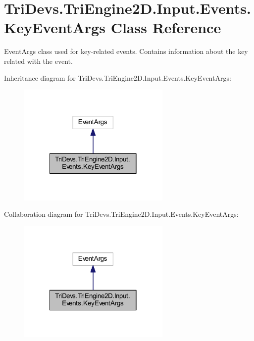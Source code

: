 \hypertarget{class_tri_devs_1_1_tri_engine2_d_1_1_input_1_1_events_1_1_key_event_args}{\section{Tri\-Devs.\-Tri\-Engine2\-D.\-Input.\-Events.\-Key\-Event\-Args Class Reference}
\label{class_tri_devs_1_1_tri_engine2_d_1_1_input_1_1_events_1_1_key_event_args}
}


Event\-Args class used for key-\/related events. Contains information about the key related with the event.  




Inheritance diagram for Tri\-Devs.\-Tri\-Engine2\-D.\-Input.\-Events.\-Key\-Event\-Args\-:
\nopagebreak
\begin{figure}[H]
\begin{center}
\leavevmode
\includegraphics[width=210pt]{class_tri_devs_1_1_tri_engine2_d_1_1_input_1_1_events_1_1_key_event_args__inherit__graph}
\end{center}
\end{figure}


Collaboration diagram for Tri\-Devs.\-Tri\-Engine2\-D.\-Input.\-Events.\-Key\-Event\-Args\-:
\nopagebreak
\begin{figure}[H]
\begin{center}
\leavevmode
\includegraphics[width=210pt]{class_tri_devs_1_1_tri_engine2_d_1_1_input_1_1_events_1_1_key_event_args__coll__graph}
\end{center}
\end{figure}
